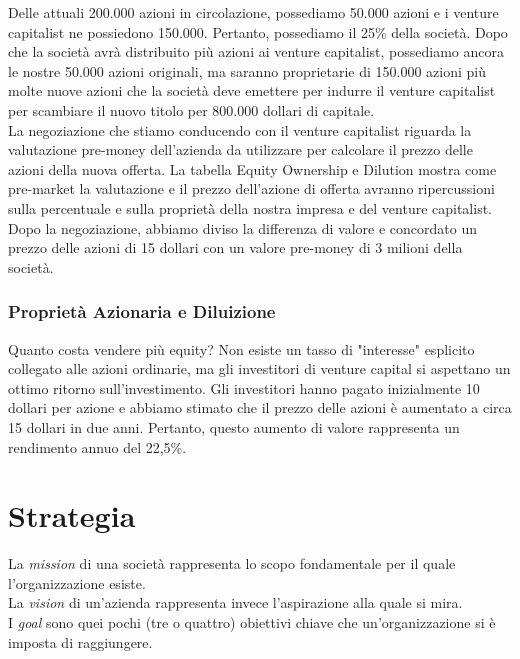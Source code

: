 \documentclass[a4paper,portrait,12pt]{article}
\theoremstyle{definition}
\begin{document}
Delle attuali 200.000 azioni in circolazione, possediamo 50.000 azioni e i venture capitalist ne possiedono 150.000.
Pertanto, possediamo il 25\% della società.
Dopo che la società avrà distribuito più azioni ai venture capitalist, possediamo ancora le nostre 50.000 azioni originali, ma saranno proprietarie di 150.000 azioni più molte nuove azioni che la società deve emettere per indurre il venture capitalist per scambiare il nuovo titolo per 800.000 dollari di capitale.\\

La negoziazione che stiamo conducendo con il venture capitalist riguarda la valutazione pre-money dell'azienda da utilizzare per calcolare il prezzo delle azioni della nuova offerta.
La tabella Equity Ownership e Dilution mostra come pre-market la valutazione e il prezzo dell'azione di offerta avranno ripercussioni sulla percentuale e sulla proprietà della nostra impresa e del venture capitalist.
Dopo la negoziazione, abbiamo diviso la differenza di valore e concordato un prezzo delle azioni di 15 dollari con un valore pre-money di 3 milioni della società.\\

\subsubsection{Proprietà Azionaria e Diluizione}

Quanto costa vendere più equity?
Non esiste un tasso di "interesse" esplicito collegato alle azioni ordinarie, ma gli investitori di venture capital si aspettano un ottimo ritorno sull'investimento.
Gli investitori hanno pagato inizialmente 10 dollari per azione e abbiamo stimato che il prezzo delle azioni è aumentato a circa 15 dollari in due anni.
Pertanto, questo aumento di valore rappresenta un rendimento annuo del 22,5\%.



\newpage
\section{Strategia}

La \emph{mission} di una società rappresenta lo scopo fondamentale per il quale l'organizzazione esiste.\\

La \emph{vision} di un'azienda rappresenta invece l'aspirazione alla quale si mira.\\

I \emph{goal} sono quei pochi (tre o quattro) obiettivi chiave che un'organizzazione si è imposta di raggiungere.\\
\end{document}
